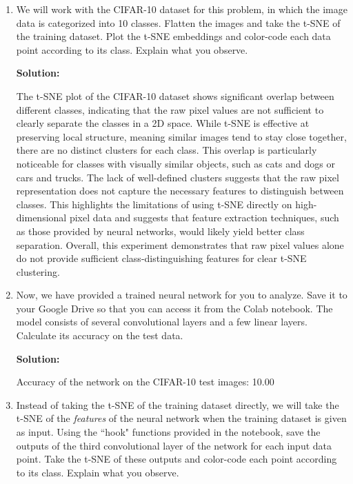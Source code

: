 \documentclass{article}
\newenvironment{solution}{\color{blue} \smallskip \textbf{Solution:}}{}
\begin{document}
\begin{enumerate}
\item We will work with the CIFAR-10 dataset for this problem, in which the image data is categorized into 10 classes. Flatten the images and take the t-SNE of the training dataset. Plot the t-SNE embeddings and color-code each data point according to its class. Explain what you observe.

\begin{solution}


The t-SNE plot of the CIFAR-10 dataset shows significant overlap between different classes, indicating that the raw pixel values are not sufficient to clearly separate the classes in a 2D space. While t-SNE is effective at preserving local structure, meaning similar images tend to stay close together, there are no distinct clusters for each class. This overlap is particularly noticeable for classes with visually similar objects, such as cats and dogs or cars and trucks. The lack of well-defined clusters suggests that the raw pixel representation does not capture the necessary features to distinguish between classes. This highlights the limitations of using t-SNE directly on high-dimensional pixel data and suggests that feature extraction techniques, such as those provided by neural networks, would likely yield better class separation. Overall, this experiment demonstrates that raw pixel values alone do not provide sufficient class-distinguishing features for clear t-SNE clustering.



\end{solution}

\newpage
\item Now, we have provided a trained neural network for you to analyze. Save it to your Google Drive so that you can access it from the Colab notebook. The model consists of several convolutional layers and a few linear layers. Calculate its accuracy on the test data. 

\begin{solution}

Accuracy of the network on the CIFAR-10 test images: 10.00%


\end{solution}

\newpage
\item Instead of taking the t-SNE of the training dataset directly, we will take the t-SNE of the \textit{features} of the neural network when the training dataset is given as input. Using the ``hook" functions provided in the notebook, save the outputs of the third convolutional layer of the network for each input data point. Take the t-SNE of these outputs and color-code each point according to its class. Explain what you observe.


\end{enumerate}
\end{document}
